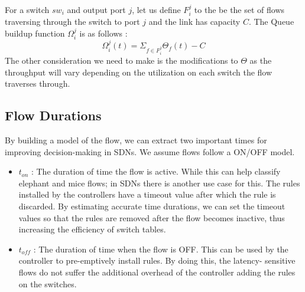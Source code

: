 \documentclass[]{article}
\begin{document}
For a switch $sw_i$ and output port $j$, let us define $F_i^j$ to the be the set of flows 
traversing through the switch to port $j$ and the link has capacity $C$. The Queue
buildup function $\Omega_i^j$ is as follows : 
\[ 
\Omega_i^j(t) = \Sigma_{f \in F_i^j} \Theta_f(t) - C  
\]
The other consideration we need to make is the modifications to $\Theta$ as the
throughput will vary depending on the utilization on each switch the flow traverses
through. 

\subsection{Flow Durations}
By building a model of the flow, we can extract two important 
times for improving decision-making in SDNs. We assume flows follow
a ON/OFF model.
\begin{itemize}
	\item $t_{on}$ : The duration of time the flow is active. While this can
	help classify elephant and mice flows; in SDNs there is another use case
	for this. The rules installed by the controllers have a timeout value after which
	the rule is discarded. By estimating accurate time durations, we can set the 
	timeout values so that the rules are removed after the flow becomes inactive,
	thus increasing the efficiency of switch tables.
	\item $t_{off}$ : The duration of time when the flow is OFF. This can be used
	by the controller to pre-emptively install rules. By doing this, the latency-
	sensitive flows do not suffer the additional overhead of the controller
	adding the rules on the switches. 
\end{itemize}
\end{document}
